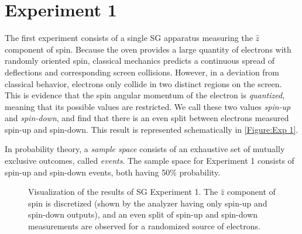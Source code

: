 \section{Experiment 1} \label{og experiment 1}
The first experiment consists of a single SG apparatus measuring the $\hat{z}$ component of spin. Because the oven provides a large quantity of electrons with randomly oriented spin, classical mechanics predicts a continuous spread of deflections and corresponding screen collisions. However, in a deviation from classical behavior, electrons only collide in two distinct regions on the screen. This is evidence that the spin angular momentum of the electron is \textit{quantized}, meaning that its possible values are restricted. We call these two values \textit{spin-up} and \textit{spin-down}, and find that there is an even split between electrons measured spin-up and spin-down. This result is represented schematically in \autoref{Figure:Exp 1}.

In probability theory, a \textit{sample space} consists of an exhaustive set of mutually exclusive outcomes, called \textit{events}. The sample space for Experiment 1 consists of spin-up and spin-down events, both having 50\% probability.

\begin{figure}[!htb]
\centering\CaptionFontSize
{}

\caption[Insert an abbreviated caption here to show in the List of Figures]
{Visualization of the results of SG Experiment 1. The $\hat{z}$ component of spin is discretized (shown by the analyzer having only spin-up and spin-down outputs), and an even split of spin-up and spin-down measurements are observed for a randomized source of electrons.}
\label{Figure:Exp 1}
\end{figure}


